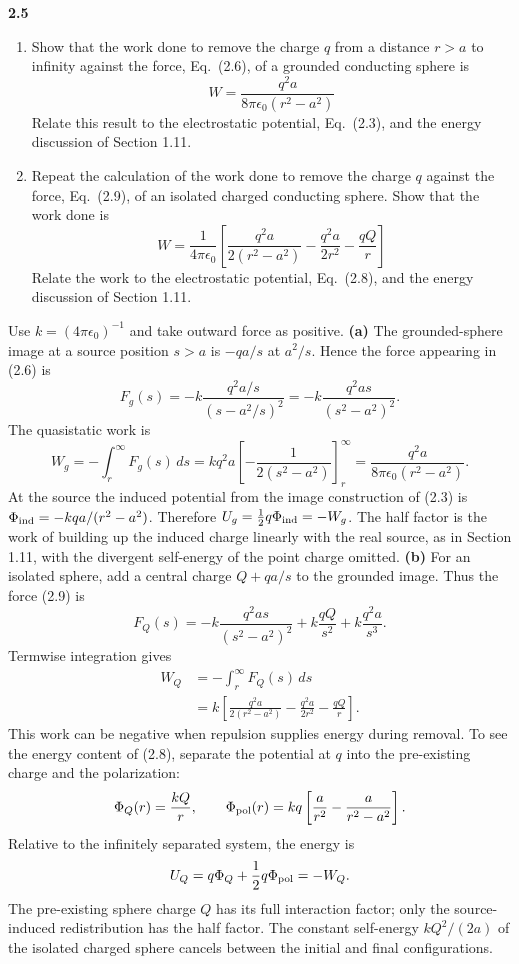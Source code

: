\par\bigskip
\noindent\textbf{2.5}\quad\begin{enumerate}
\item[(a)] Show that the work done to remove the charge $q$ from a distance $r>a$ to infinity against the force, Eq.~(2.6), of a grounded conducting sphere is
\[
W=\frac{q^{2}a}{8\pi\epsilon_{0}(r^{2}-a^{2})}
\]
Relate this result to the electrostatic potential, Eq.~(2.3), and the energy discussion of Section 1.11.
\item[(b)] Repeat the calculation of the work done to remove the charge $q$ against the force, Eq.~(2.9), of an isolated charged conducting sphere. Show that the work done is
\[
W=\frac{1}{4\pi\epsilon_{0}}\left[\frac{q^{2}a}{2(r^{2}-a^{2})}-\frac{q^{2}a}{2r^{2}}-\frac{qQ}{r}\right]
\]
Relate the work to the electrostatic potential, Eq.~(2.8), and the energy discussion of Section 1.11.
\end{enumerate}
\solution
Use $k=(4\pi\epsilon _0)^{-1}$ and take outward force as positive.
\textbf{(a)} The grounded-sphere image at a source position $s>a$ is
$-qa/s$ at $a^2/s$. Hence the force appearing in (2.6) is
\[
F_g(s)=-k\frac{q^2a/s}{(s-a^2/s)^2}
       =-k\frac{q^2as}{(s^2-a^2)^2}.
\]
The quasistatic work is
\[
W_g=-\int_r^\infty F_g(s)\,ds
=kq^2a\left[-\frac1{2(s^2-a^2)}\right]_r^\infty
=\boxed{\frac{q^2a}{8\pi\epsilon _0(r^2-a^2)}}.
\]
At the source the induced potential from the image construction
of (2.3) is $\Phi_{\rm ind}=-kqa/(r^2-a^2)$.
Therefore $U_g=\tfrac12q\Phi_{\rm ind}=-W_g$.
The half factor is the work of building up the induced charge
linearly with the real source, as in Section 1.11, with the divergent
self-energy of the point charge omitted.
\textbf{(b)} For an isolated sphere, add a central charge
$Q+qa/s$ to the grounded image. Thus the force (2.9) is
\[
F_Q(s)=-k\frac{q^2as}{(s^2-a^2)^2}
        +k\frac{qQ}{s^2}+k\frac{q^2a}{s^3}.
\]
Termwise integration gives
\begin{align*}
W_Q&=-\int_r^\infty F_Q(s)\,ds\\
&=\boxed{k\left[\frac{q^2a}{2(r^2-a^2)}
              -\frac{q^2a}{2r^2}-\frac{qQ}{r}\right]}.
\end{align*}
This work can be negative when repulsion supplies energy during
removal. To see the energy content of (2.8), separate the potential at
$q$ into the pre-existing charge and the polarization:
\[
\Phi_Q(r)=\frac{kQ}{r},\qquad
\Phi_{\rm pol}(r)=kq\left[\frac{a}{r^2}-\frac{a}{r^2-a^2}\right].
\]
Relative to the infinitely separated system, the energy is
\[
U_Q=q\Phi_Q+\frac12q\Phi_{\rm pol}=-W_Q.
\]
The pre-existing sphere charge $Q$ has its full interaction factor;
only the source-induced redistribution has the half factor.
The constant self-energy $kQ^2/(2a)$ of the isolated charged sphere
cancels between the initial and final configurations.

